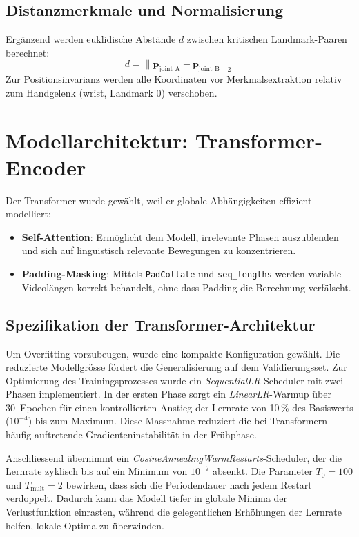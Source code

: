 \subsection{Distanzmerkmale und Normalisierung}
Ergänzend werden euklidische Abstände $d$ zwischen kritischen Landmark-Paaren berechnet:
\begin{equation}
    d = \|\mathbf{p}_{\text{joint\_A}} - \mathbf{p}_{\text{joint\_B}}\|_2
\end{equation}
Zur Positionsinvarianz werden alle Koordinaten vor Merkmalsextraktion relativ zum Handgelenk (wrist, Landmark 0) verschoben.

\section{Modellarchitektur: Transformer-Encoder}
Der Transformer wurde gewählt, weil er globale Abhängigkeiten effizient modelliert:
\begin{itemize}
    \item \textbf{Self-Attention}: Ermöglicht dem Modell, irrelevante Phasen auszublenden und sich auf linguistisch relevante Bewegungen zu konzentrieren.
    \item \textbf{Padding-Masking}: Mittels \texttt{PadCollate} und \texttt{seq\_lengths} werden variable Videolängen korrekt behandelt, ohne dass Padding die Berechnung verfälscht.
\end{itemize}

\subsection{Spezifikation der Transformer-Architektur}
Um Overfitting vorzubeugen, wurde eine kompakte Konfiguration gewählt. Die reduzierte Modellgrösse fördert die Generalisierung auf dem Validierungsset.
Zur Optimierung des Trainingsprozesses wurde ein \textit{SequentialLR}-Scheduler mit zwei Phasen implementiert. In der ersten Phase sorgt ein \textit{LinearLR}-Warmup über 30~Epochen für einen kontrollierten Anstieg der Lernrate von 10\,\% des Basiswerts ($10^{-4}$) bis zum Maximum. Diese Massnahme reduziert die bei Transformern häufig auftretende Gradienteninstabilität in der Frühphase. 

Anschliessend übernimmt ein \textit{CosineAnnealingWarmRestarts}-Scheduler, der die Lernrate zyklisch bis auf ein Minimum von $10^{-7}$ absenkt. Die Parameter $T_0 = 100$ und $T_{\text{mult}} = 2$ bewirken, dass sich die Periodendauer nach jedem Restart verdoppelt. Dadurch kann das Modell tiefer in globale Minima der Verlustfunktion einrasten, während die gelegentlichen Erhöhungen der Lernrate helfen, lokale Optima zu überwinden.

